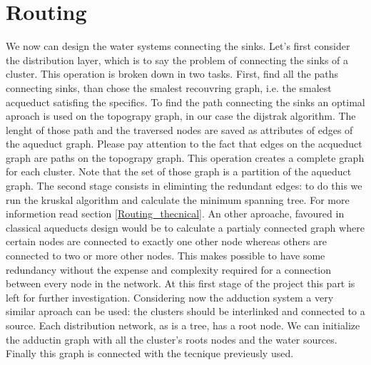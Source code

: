 \section {Routing}
We now can design the water systems connecting the sinks. Let’s first consider the distribution layer, which is to say the problem of connecting the sinks of a cluster. This operation is broken down in two tasks. First, find all the paths connecting sinks, than chose the smalest recouvring graph, i.e. the smalest acqueduct satisfing the specifics. \hfill 
To find the path connecting the sinks an optimal aproach is used on the topograpy graph, in our case the dijstrak algorithm. The lenght of those path and the traversed nodes are saved as attributes of edges of the aqueduct graph. Please pay attention to the fact that edges on the acqueduct graph are paths on the topograpy graph. This operation creates a complete graph for each cluster. Note that the set of those graph is a partition of the aqueduct graph. \hfill 
The second stage consists in eliminting the redundant edges: to do this we run the kruskal algorithm and calculate the minimum spanning tree. For more informetion read section \ref {Routing_thecnical}. An other aproache, favoured in classical aqueducts design would be to calculate a partialy connected graph where certain nodes are connected to exactly one other node whereas others are connected to two or more other nodes. This makes possible to have some redundancy without the expense and complexity required for a connection between every node in the network. At this first stage of the project this part is left for further investigation.
Considering now the adduction system a very similar aproach can be used: the clusters should be interlinked and connected to a source. Each distribution network, as is a tree, has a root node. We can initialize the adductin graph with all the cluster's roots nodes and the water sources. Finally this graph is connected with the tecnique previeusly used.

